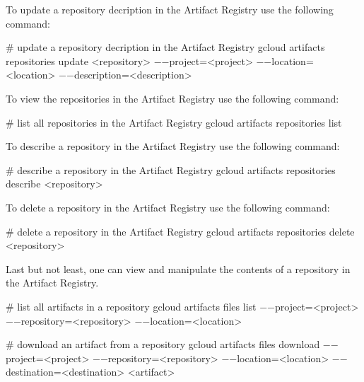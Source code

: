 To update a repository decription in the Artifact Registry use the following command:
\begin{bash}
# update a repository decription in the Artifact Registry
gcloud artifacts repositories update <repository>
    $-$$-$project=<project>
    $-$$-$location=<location>
    $-$$-$description=<description>
\end{bash}

To view the repositories in the Artifact Registry use the following command:
\begin{bash}
# list all repositories in the Artifact Registry
gcloud artifacts repositories list
\end{bash}

To describe a repository in the Artifact Registry use the following command:
\begin{bash}
# describe a repository in the Artifact Registry
gcloud artifacts repositories describe <repository>
\end{bash}

To delete a repository in the Artifact Registry use the following command:
\begin{bash}
# delete a repository in the Artifact Registry
gcloud artifacts repositories delete <repository>
\end{bash}

Last but not least, one can view and manipulate the contents of a repository in the Artifact Registry.

\begin{bash}
# list all artifacts in a repository
gcloud artifacts files list
    $-$$-$project=<project>
    $-$$-$repository=<repository>
    $-$$-$location=<location>
\end{bash}

\begin{bash}
# download an artifact from a repository
gcloud artifacts files download
    $-$$-$project=<project>
    $-$$-$repository=<repository>
    $-$$-$location=<location>
    $-$$-$destination=<destination>
    <artifact>
\end{bash}